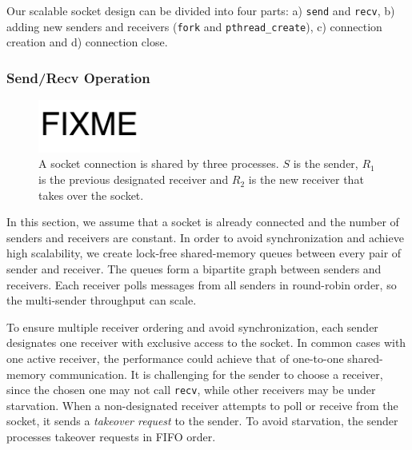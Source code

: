 Our scalable socket design can be divided into four parts: a) \texttt{send} and \texttt{recv}, b) adding new senders and receivers (\texttt{fork} and \texttt{pthread\_create}), c) connection creation and d) connection close.

\subsubsection{Send/Recv Operation}
\label{subsubsec:fork_rdwr}

\begin{figure}[t]
	\centering
	\includegraphics[width=0.3\textwidth]{images/fixme}
	\caption{A socket connection is shared by three processes. $S$ is the sender, $R_1$ is the previous designated receiver and $R_2$ is the new receiver that takes over the socket.}
	\label{fig:fork-takeover}
\end{figure}

In this section, we assume that a socket is already connected and the number of senders and receivers are constant. In order to avoid synchronization and achieve high scalability, we create lock-free shared-memory queues between every pair of sender and receiver. The queues form a bipartite graph between senders and receivers. Each receiver polls messages from all senders in round-robin order, so the multi-sender throughput can scale.

To ensure multiple receiver ordering and avoid synchronization, each sender designates one receiver with exclusive access to the socket. In common cases with one active receiver, the performance could achieve that of one-to-one shared-memory communication. It is challenging for the sender to choose a receiver, since the chosen one may not call \texttt{recv}, while other receivers may be under starvation. When a non-designated receiver attempts to poll or receive from the socket, it sends a \textit{takeover request} to the sender. To avoid starvation, the sender processes takeover requests in FIFO order.

